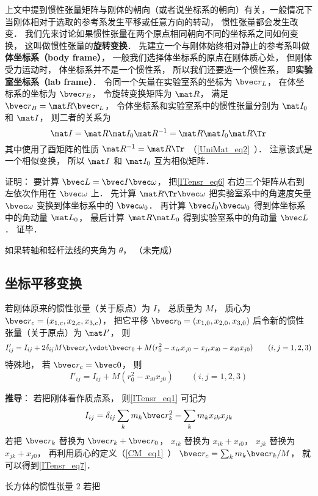 上文中提到惯性张量矩阵与刚体的朝向（或者说坐标系的朝向）有关，一般情况下当刚体相对于选取的参考系发生平移或任意方向的转动， 惯性张量都会发生改变．  我们先来讨论如果惯性张量在两个原点相同朝向不同的坐标系之间如何变换， 这叫做惯性张量的\textbf{旋转变换}． 先建立一个与刚体始终相对静止的参考系叫做\textbf{体坐标系（body frame）}， 一般我们选择体坐标系的原点在刚体质心处， 但刚体受力运动时， 体坐标系并不是一个惯性系， 所以我们还要选一个惯性系， 即\textbf{实验室坐标系（lab frame）}． 令同一个矢量在实验室系的坐标为 $\bvec r_{L}$， 在体坐标系的坐标为 $\bvec r_{B}$， 令旋转变换矩阵为 $\mat R$， 满足 $\bvec r_B = \mat R\bvec r_L$， 令体坐标系和实验室系中的惯性张量分别为 $\mat I_0$ 和 $\mat I$， 则二者的关系为
\begin{equation}\label{ITensr_eq6}
\mat I = \mat R \mat I_0 \mat R^{-1} = \mat R \mat I_0 \mat R\Tr
\end{equation}
其中使用了酉矩阵的性质 $\mat R^{-1} = \mat R\Tr$ （\autoref{UniMat_eq2}~）． 注意该式是一个相似变换， 所以 $\mat I$ 和 $\mat I_0$ 互为相似矩阵．

证明： 要计算 $\bvec L = \bvec I \bvec \omega$， 把\autoref{ITensr_eq6} 右边三个矩阵从右到左依次作用在 $\bvec \omega$ 上． 先计算 $\mat R\Tr \bvec \omega$ 把实验室系中的角速度矢量 $\bvec \omega$ 变换到体坐标系中的 $\bvec \omega_0$． 再计算 $\bvec I_0 \bvec \omega_0$ 得到体坐标系中的角动量 $\mat L_0$， 最后计算 $\mat R \mat L_0$ 得到实验室系中的角动量 $\bvec L$． 证毕．

\begin{example}{}
如果转轴和轻杆法线的夹角为 $\theta$， （未完成）
\end{example}

\subsection{坐标平移变换}
若刚体原来的惯性张量（关于原点）为 $I$， 总质量为 $M$， 质心为 $\bvec r_c = (x_{1,c}, x_{2,c}, x_{3,c})$， 把它平移 $\bvec r_0 = (x_{1,0}, x_{2,0}, x_{3,0})$ 后令新的惯性张量（关于原点）为 $\mat I'$， 则
\begin{equation}\label{ITensr_eq7}
I'_{ij} = I_{ij} + 2 \delta_{ij} M\bvec r_c\vdot \bvec r_0 + M(r_0^2 - x_{ic}x_{j0} - x_{jc}x_{i0} - x_{i0}x_{j0})\qquad (i, j = 1, 2, 3)
\end{equation}
特殊地， 若 $\bvec r_c = \bvec 0$， 则
\begin{equation}
I'_{ij} = I_{ij} + M(r_0^2 - x_{i0}x_{j0})\qquad (i, j = 1, 2, 3)
\end{equation}


\textbf{推导}： 若把刚体看作质点系， 则\autoref{ITensr_eq1} 可记为
\begin{equation}
I_{ij} = \delta_{ij}\sum_k m_k \bvec r_k^2 - \sum_k m_k x_{ik}x_{jk}
\end{equation}
若把 $\bvec r_k$ 替换为 $\bvec r_k + \bvec r_0$， $x_{ik}$ 替换为 $x_{ik} + x_{i0}$， $x_{jk}$ 替换为 $x_{jk} + x_{j0}$， 再利用质心的定义（\autoref{CM_eq1}~） $\bvec r_c = \sum_k m_k\bvec r_k/M$， 就可以得到\autoref{ITensr_eq7}．

\begin{exercise}{长方体的惯性张量 2}
若把
\end{exercise}
